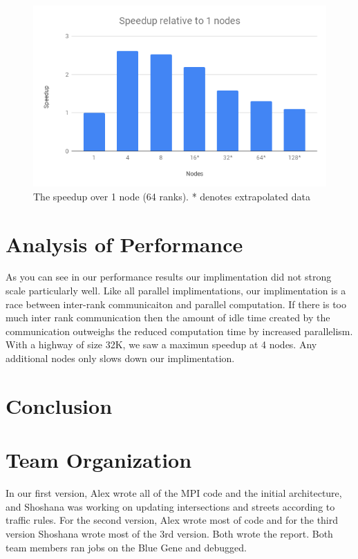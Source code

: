 \documentclass[10pt,a4paper]{article}
\begin{document}
    \begin{figure}[H]
        \centering
        \includegraphics[scale=0.3]{speedup.png}
        \caption{The speedup over 1 node (64 ranks). * denotes extrapolated data}
        \label{fig:my_label}
    \end{figure}
    
    
    \section{Analysis of Performance}
    
    As you can see in our performance results our implimentation did not strong scale
    particularly well. Like all parallel implimentations, our implimentation is a race between inter-rank communicaiton and parallel computation. If there is too much inter rank communication then the amount of idle time created by the communication outweighs the reduced computation time by increased parallelism. With a highway of size 32K, we saw a maximun speedup at 4 nodes. Any additional nodes only slows down our implimentation.
    
    \section{Conclusion}
    
    \section{Team Organization}
    
    In our first version, Alex wrote all of the MPI code and the initial architecture, and Shoshana was working on updating intersections and streets according to traffic rules. For the second version, Alex wrote most of code and for the third version Shoshana wrote most of the 3rd version. Both wrote the report. Both team members ran jobs on the Blue Gene and debugged.
    
    
    
    
    
    
\end{document}
